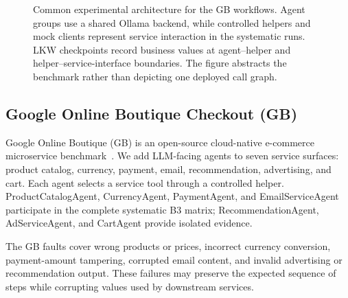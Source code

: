 \documentclass[sigconf,review,anonymous,balance=false]{acmart}
\begin{document}
\begin{figure}[t]
{}
\caption{Common experimental architecture for the GB workflows. Agent
groups use a shared Ollama backend, while controlled helpers and mock clients
represent service interaction in the systematic runs. LKW checkpoints record
business values at agent--helper and helper--service-interface boundaries. The
figure abstracts the benchmark rather than depicting one deployed call
graph.}
\label{fig:architecture-simple}
\end{figure}

\subsection{Google Online Boutique Checkout (GB)}

Google Online Boutique (GB) is an open-source cloud-native e-commerce
microservice benchmark~\cite{google-ob}. We add LLM-facing agents to seven
service surfaces: product catalog, currency, payment, email, recommendation,
advertising, and cart. Each agent selects a service tool through a controlled
helper. ProductCatalogAgent, CurrencyAgent, PaymentAgent, and EmailServiceAgent
participate in the complete systematic B3 matrix; RecommendationAgent,
AdServiceAgent, and CartAgent provide isolated evidence.

The GB faults cover wrong products or prices, incorrect currency conversion,
payment-amount tampering, corrupted email content, and invalid advertising or
recommendation output. These failures may preserve the expected sequence of
steps while corrupting values used by downstream services.
\end{document}
